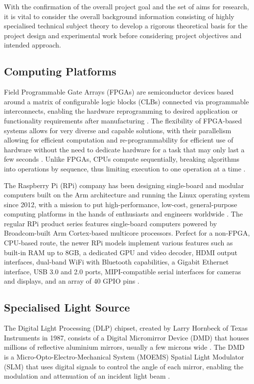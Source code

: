 With the confirmation of the overall project goal and the set of aims for research, it is vital to consider the overall background information consisting of highly specialised technical subject theory to develop a rigorous theoretical basis for the project design and experimental work before considering project objectives and intended approach.

\subsection{Computing Platforms}
Field Programmable Gate Arrays (FPGAs) are semiconductor devices based around a matrix of configurable logic blocks (CLBs) connected via programmable interconnects, enabling the hardware reprogramming to desired application or functionality requirements after manufacturing \cite{WhatFPGAField}. The flexibility of FPGA-based systems allows for very diverse and capable solutions, with their parallelism allowing for efficient computation and re-programmability for efficient use of hardware without the need to dedicate hardware for a task that may only last a few seconds \cite{villalpandoReconfigurableMachineVision2010}. Unlike FPGAs, CPUs compute sequentially, breaking algorithms into operations by sequence, thus limiting execution to one operation at a time \cite{alexliangBoostingMachineVision2016}.

The Raspberry Pi (RPi) company has been designing single-board and modular computers built on the Arm architecture and running the Linux operating system since 2012, with a mission to put high-performance, low-cost, general-purpose computing platforms in the hands of enthusiasts and engineers worldwide \cite{raspberrypiRaspberryPiUs}. The regular RPi product series features single-board computers powered by Broadcom-built Arm Cortex-based multicore processors. Perfect for a non-FPGA, CPU-based route, the newer RPi models implement various features such as built-in RAM up to 8GB, a dedicated GPU and video decoder, HDMI output interfaces, dual-band WiFi with Bluetooth capabilities, a Gigabit Ethernet interface, USB 3.0 and 2.0 ports, MIPI-compatible serial interfaces for cameras and displays, and an array of 40 GPIO pins \cite{raspberrypiltdBuyRaspberryPi, raspberrypiltdBuyRaspberryPia}.

\subsection{Specialised Light Source}
The Digital Light Processing (DLP) chipset, created by Larry Hornbeck of Texas Instruments in 1987, consists of a Digital Micromirror Device (DMD) that houses millions of reflective aluminium mirrors, usually a few microns wide \cite{DigitalLightProcessing2024, HowDoesDLP}. The DMD is a Micro-Opto-Electro-Mechanical System (MOEMS) Spatial Light Modulator (SLM) that uses digital signals to control the angle of each mirror, enabling the modulation and attenuation of an incident light beam \cite{DLP4500DigitalMicromirror}.

